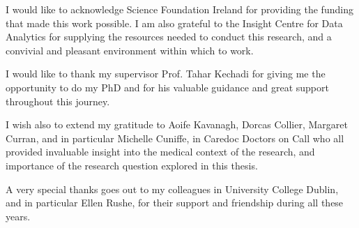 
\begin{acknowledgements}      


I would like to acknowledge Science Foundation Ireland for providing the funding that made this work possible. I am also grateful to the Insight Centre for Data Analytics for supplying the resources needed to conduct this research, and a convivial and pleasant environment within which to work.

I would like to thank my supervisor Prof. Tahar Kechadi for giving me the opportunity to do my PhD
and for his valuable guidance and great support throughout this journey.

I wish also to extend my gratitude to Aoife Kavanagh, Dorcas Collier, Margaret Curran, and in particular Michelle Cuniffe, in Caredoc Doctors on Call who all provided invaluable insight into the medical context of the research, and importance of the research question explored in this thesis.     

A very special thanks goes out to my colleagues in University College Dublin, and in particular Ellen Rushe, for their support and friendship during all these years.

\end{acknowledgements}
